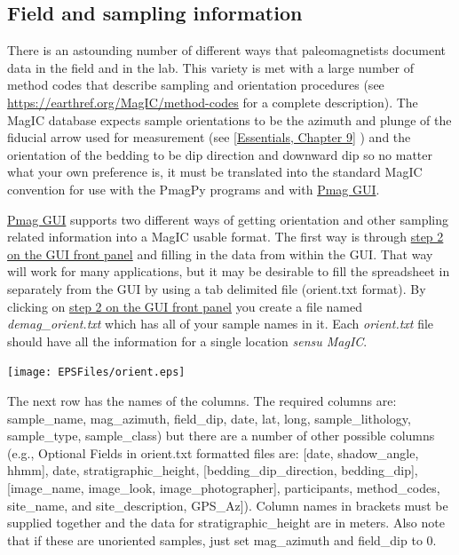 \documentclass[11pt]{book}
\begin{document}
{{

\subsection{Field and sampling information}

 There is an astounding number of different ways that paleomagnetists document data in the field and in the lab. This variety is met with a large number  of method codes that describe sampling and orientation procedures (see \url{https://earthref.org/MagIC/method-codes} for a complete description).   The MagIC database expects sample orientations to be the azimuth and plunge of the fiducial arrow used for measurement (see  \href{http://earthref.org/MAGIC/books/Tauxe/Essentials/WebBook3ch2.html#ch2}{[Essentials, Chapter 9]} )  and the orientation of the bedding to be dip direction and downward dip so no matter what your own preference is, it must be translated into the standard MagIC convention for use with the PmagPy programs and with \href{#pmag_gui.py}{Pmag GUI}.

\href{#pmag_gui.py}{Pmag GUI}  supports two different ways of getting orientation and other sampling related information into a MagIC usable format.  The first way is through \href{#orient}{step 2 on the GUI front panel} and filling in the data from within the GUI.  That way will work for many applications, but it may be desirable to fill the spreadsheet in separately from the GUI by using  a tab delimited file (orient.txt format).   By clicking on  \href{#orient}{step 2 on the GUI front panel}  you create a file named {\it demag\_orient.txt}  which has all of your sample names in it.   Each {\it orient.txt} file should  have all the information for a single location {\it sensu MagIC}.


  \texttt{[image: EPSFiles/orient.eps]}

 The next row has the names of the columns.  The required columns are:  sample\_name, mag\_azimuth, field\_dip, date, lat, long, sample\_lithology, sample\_type, sample\_class) but there are a number of other possible columns (e.g., Optional Fields in orient.txt formatted files are: [date, shadow\_angle, hhmm], date, stratigraphic\_height, [bedding\_dip\_direction, bedding\_dip], [image\_name, image\_look, image\_photographer], participants, method\_codes, site\_name, and site\_description, GPS\_Az]).  Column names in brackets must be supplied together and the data for stratigraphic\_height are in meters.  Also note that if these are unoriented samples, just set mag\_azimuth and field\_dip to 0.

}}
\end{document}
